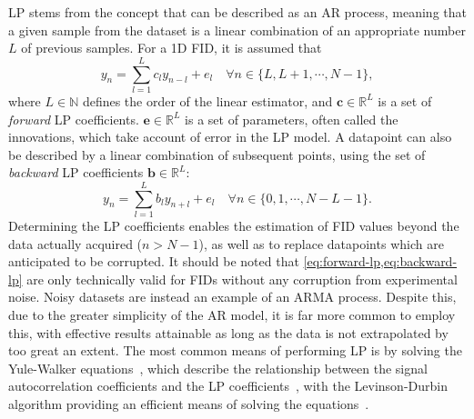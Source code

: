 \ac{LP} stems from the concept that  can be described as
an \ac{AR} process, meaning that a given sample from the dataset is a linear
combination of an appropriate number $L$ of previous samples. For a \ac{1D}
\ac{FID}, it is assumed that
\begin{equation}
    y_n = \sum_{l=1}^{L}
    c_l y_{n-l} + e_l \quad
    \forall n \in \lbrace L, L + 1, \cdots, N - 1 \rbrace,
    \label{eq:forward-lp}
\end{equation}
where $L \in
\mathbb{N}$ defines the order of the linear estimator, and $\symbf{c} \in
\mathbb{R}^{L}$ is a set of \emph{forward} \ac{LP} coefficients. $\symbf{e} \in
\mathbb{R}^L$ is a set of parameters, often called the innovations,
which take account of error in the \ac{LP} model. A datapoint can also be
described by a linear combination of subsequent points, using the set of
\emph{backward}
\ac{LP} coefficients $\symbf{b} \in \mathbb{R}^L$:
\begin{equation}
    y_n = \sum_{l=1}^{L}
    b_l y_{n+l} + e_l \quad
    \forall n \in \lbrace 0, 1, \cdots, N - L - 1 \rbrace.
    \label{eq:backward-lp}
\end{equation}
Determining
the \ac{LP} coefficients enables the estimation of \ac{FID} values beyond the
data actually acquired ($n > N - 1$), as well as to replace
datapoints which are anticipated to be corrupted. It should be noted that
\cref{eq:forward-lp,eq:backward-lp} are only technically valid for
\acp{FID} without any corruption from experimental noise. Noisy datasets are
instead an example of an \ac{ARMA} process. Despite this, due to the greater
simplicity of the \ac{AR} model, it is far more common to employ this, with
effective results attainable as long as the data is not extrapolated by too
great an extent. The most common means of performing \ac{LP} is by solving the
Yule-Walker equations~\cite{Yule1927,Walker1931}, which describe the
relationship between the signal autocorrelation coefficients and the \ac{LP}
coefficients~\cite[Section 3.3]{Koehl1999}, with the Levinson-Durbin algorithm
providing an efficient means of solving the
equations~\cite{Levinson1946,Durbin1960}.

